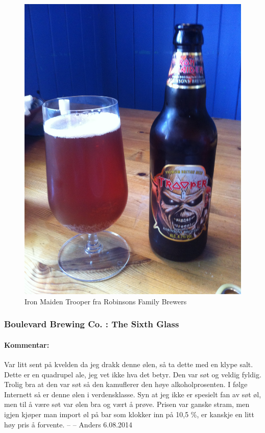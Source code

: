 \documentclass[12pt,a4paper,oneside,norsk]{article}
\begin{document}
\begin{figure} [H]
\centering
\includegraphics[scale=0.1, angle=270]{Bilder/Ol/thetrooper}
\caption{Iron Maiden Trooper fra Robinsons Family Brewers}
\end{figure}


\newpage
\subsubsection{Boulevard Brewing Co. : The Sixth Glass}
\paragraph{Kommentar:}Var litt sent på kvelden da jeg drakk denne ølen, så ta dette med en klype salt. Dette er en quadrupel ale, jeg vet ikke hva det betyr. Den var søt og veldig fyldig. Trolig bra at den var søt så den kamuflerer den høye alkoholprosenten. I følge Internett så er denne ølen i verdensklasse. Syn at jeg ikke er spesielt fan av søt øl, men til å være søt var ølen bra og vært å prøve. Prisen var ganske stram, men igjen kjøper man import øl på bar som klokker inn på 10,5 \%, er kanskje en litt høy pris å forvente. 
\newline
-- -- Anders 6.08.2014
\end{document}
